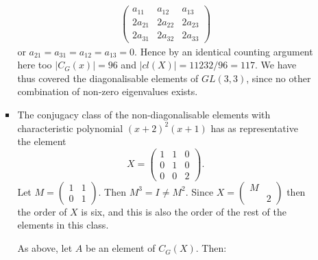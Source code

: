 \documentclass[11pt]{article} \usepackage{amssymb}
\begin{document}
\begin{enumerate}
\begin{enumerate}
\begin{itemize}
\begin{eqnarray*}
\begin{pmatrix}
            a_{11}&a_{12}  &a_{13} \\ 
            2a_{21}&2a_{22}  &2a_{23} \\ 
            2a_{31}&2a_{32}  &2a_{33} 
          \end{pmatrix}
        \end{eqnarray*}
        or $a_{21}=a_{31}=a_{12}=a_{13}=0$. Hence by an identical counting argument
        here too 
        $|C_G(x)|=96$ and $|cl(X)|=11232/96=117$. We have thus covered the diagonalisable
        elements of $GL(3,3)$, since no other combination of non-zero eigenvalues
        exists. 
      \item
        The conjugacy class of the non-diagonalisable elements with 
        characteristic polynomial
        $(x+2)^2(x+1)$ has as representative the element
        \begin{equation*}
          X=
          \begin{pmatrix}
            1&1  &0 \\ 
            0&1  &0 \\ 
            0&0  &2 
          \end{pmatrix}.
        \end{equation*}
        Let $M=\begin{pmatrix}1&1\\0&1\end{pmatrix}$. Then 
        $M^3=I\neq M^2$. Since $X=\begin{pmatrix}M&\\&2\end{pmatrix}$ then the order of $X$ is six, and this is
        also the order of the rest of the elements in this class.
        
        As above, let $A$ be an element of $C_G(X)$. Then:
        

\end{itemize}
\end{enumerate}
\end{enumerate}
\end{document}
